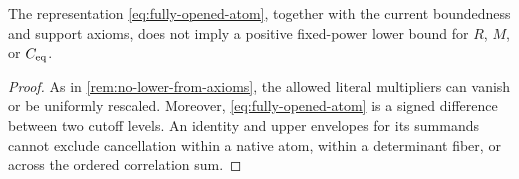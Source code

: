 \begin{proposition}
\label{prop:no-lower-opened}
The representation \eqref{eq:fully-opened-atom}, together with the
current boundedness and support axioms, does not imply a positive
fixed-power lower bound for \(R\), \(M\), or \(C_{\mathrm{eq}}\).
\end{proposition}

\begin{proof}
As in \cref{rem:no-lower-from-axioms}, the allowed literal
multipliers can vanish or be uniformly rescaled.  Moreover,
\eqref{eq:fully-opened-atom} is a signed difference between two cutoff
levels.  An identity and upper envelopes for its summands cannot
exclude cancellation within a native atom, within a determinant
fiber, or across the ordered correlation sum.
\end{proof}
